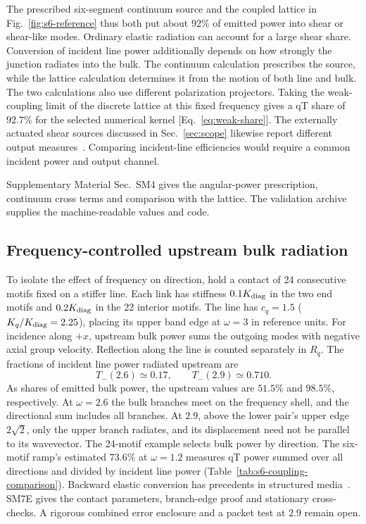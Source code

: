 \documentclass[10pt,aps,onecolumn,floatfix,notitlepage,nofootinbib,showkeys]{revtex4-2}
\begin{document}
The prescribed six-segment continuum source and the coupled lattice in Fig.~\ref{fig:s6-reference} thus both put about $92\%$ of emitted power into shear or shear-like modes. Ordinary elastic radiation can account for a large shear share. Conversion of incident line power additionally depends on how strongly the junction radiates into the bulk. The continuum calculation prescribes the source, while the lattice calculation determines it from the motion of both line and bulk. The two calculations also use different polarization projectors. Taking the weak-coupling limit of the discrete lattice at this fixed frequency gives a qT share of $92.7\%$ for the selected numerical kernel [Eq.~\eqref{eq:weak-share}]. The externally actuated shear sources discussed in Sec.~\ref{sec:scope} likewise report different output measures~\cite{Liang2026MetaExcitation,Lu2026ThreeDimensional}. Comparing incident-line efficiencies would require a common incident power and output channel.

Supplementary Material Sec.~SM4 gives the angular-power prescription, continuum cross terms and comparison with the lattice. The validation archive supplies the machine-readable values and code.

\subsection{Frequency-controlled upstream bulk radiation}
\label{sec:pred-backward}

To isolate the effect of frequency on direction, hold a contact of 24 consecutive motifs fixed on a stiffer line. Each link has stiffness $0.1K_{\rm diag}$ in the two end motifs and $0.2K_{\rm diag}$ in the 22 interior motifs. The line has $c_q=1.5$ ($K_q/K_{\rm diag}=2.25$), placing its upper band edge at $\omega=3$ in reference units. For incidence along $+x$, upstream bulk power sums the outgoing modes with negative axial group velocity. Reflection along the line is counted separately in $R_q$. The fractions of incident line power radiated upstream are
\begin{equation}
 T_-(2.6)\simeq0.17,\qquad T_-(2.9)\simeq0.710.
 \label{eq:s6-upstream-control}
\end{equation}
As shares of emitted bulk power, the upstream values are $51.5\%$ and $98.5\%$, respectively. At $\omega=2.6$ the bulk branches meet on the frequency shell, and the directional sum includes all branches. At $2.9$, above the lower pair's upper edge $2\sqrt{2}$, only the upper branch radiates, and its displacement need not be parallel to its wavevector. The 24-motif example selects bulk power by direction. The six-motif ramp's estimated $73.6\%$ at $\omega=1.2$ measures qT power summed over all directions and divided by incident line power (Table~\ref{tab:s6-coupling-comparison}). Backward elastic conversion has precedents in structured media~\cite{Chaplain2020}. SM7E gives the contact parameters, branch-edge proof and stationary cross-checks. A rigorous combined error enclosure and a packet test at $2.9$ remain open.
\end{document}

